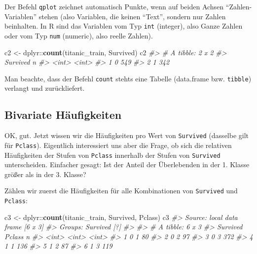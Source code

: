 \documentclass[12pt,ngerman,]{book}
\makeatletter
\newenvironment{Shaded}{\begin{snugshade}}{\end{snugshade}}
\newcommand{\KeywordTok}[1]{\textcolor[rgb]{0.13,0.29,0.53}{\textbf{{#1}}}}
\newcommand{\StringTok}[1]{\textcolor[rgb]{0.31,0.60,0.02}{{#1}}}
\newcommand{\CommentTok}[1]{\textcolor[rgb]{0.56,0.35,0.01}{\textit{{#1}}}}
\newcommand{\NormalTok}[1]{{#1}}
\newenvironment{kframe}{%
\medskip{}
\setlength{\fboxsep}{.8em}
 \def\at@end@of@kframe{}%
 \ifinner\ifhmode%
  \def\at@end@of@kframe{\end{minipage}}%
  \begin{minipage}{\columnwidth}%
 \fi\fi%
 \def\FrameCommand##1{\hskip\@totalleftmargin \hskip-\fboxsep
 \colorbox{shadecolor}{##1}\hskip-\fboxsep
     \hskip-\linewidth \hskip-\@totalleftmargin \hskip\columnwidth}%
 \MakeFramed {\advance\hsize-\width
   \@totalleftmargin\z@ \linewidth\hsize
   \@setminipage}}%
 {\par\unskip\endMakeFramed%
 \at@end@of@kframe}
\renewenvironment{Shaded}{\begin{kframe}}{\end{kframe}}
\makeatother
\begin{document}
Der Befehl \texttt{qplot} zeichnet automatisch Punkte, wenn auf beiden
Achsen ``Zahlen-Variablen'' stehen (also Variablen, die keinen ``Text'',
sondern nur Zahlen beinhalten. In R sind das Variablen vom Typ
\texttt{int} (integer), also Ganze Zahlen oder vom Typ \texttt{num}
(numeric), also reelle Zahlen).

\begin{Shaded}
\begin{Highlighting}[]

\NormalTok{c2 <-}\StringTok{ }\NormalTok{dplyr::}\KeywordTok{count}\NormalTok{(titanic_train, Survived)}
\NormalTok{c2}
\CommentTok{#> # A tibble: 2 x 2}
\CommentTok{#>   Survived     n}
\CommentTok{#>      <int> <int>}
\CommentTok{#> 1        0   549}
\CommentTok{#> 2        1   342}
\end{Highlighting}
\end{Shaded}

Man beachte, dass der Befehl \texttt{count} stehts eine Tabelle
(data.frame bzw. \texttt{tibble}) verlangt und zurückliefert.

\subsection{Bivariate Häufigkeiten}\label{bivariate-haufigkeiten}

OK, gut. Jetzt wissen wir die Häufigkeiten pro Wert von
\texttt{Survived} (dasselbe gilt für \texttt{Pclass}). Eigentlich
interessiert uns aber die Frage, ob sich die relativen Häufigkeiten der
Stufen von \texttt{Pclass} innerhalb der Stufen von \texttt{Survived}
unterscheiden. Einfacher gesagt: Ist der Anteil der Überlebenden in der
1. Klasse größer als in der 3. Klasse?

Zählen wir zuerst die Häufigkeiten für alle Kombinationen von
\texttt{Survived} und \texttt{Pclass}:

\begin{Shaded}
\begin{Highlighting}[]
\NormalTok{c3 <-}\StringTok{ }\NormalTok{dplyr::}\KeywordTok{count}\NormalTok{(titanic_train, Survived, Pclass)}
\NormalTok{c3}
\CommentTok{#> Source: local data frame [6 x 3]}
\CommentTok{#> Groups: Survived [?]}
\CommentTok{#> }
\CommentTok{#> # A tibble: 6 x 3}
\CommentTok{#>   Survived Pclass     n}
\CommentTok{#>      <int>  <int> <int>}
\CommentTok{#> 1        0      1    80}
\CommentTok{#> 2        0      2    97}
\CommentTok{#> 3        0      3   372}
\CommentTok{#> 4        1      1   136}
\CommentTok{#> 5        1      2    87}
\CommentTok{#> 6        1      3   119}
\end{Highlighting}
\end{Shaded}
\end{document}
